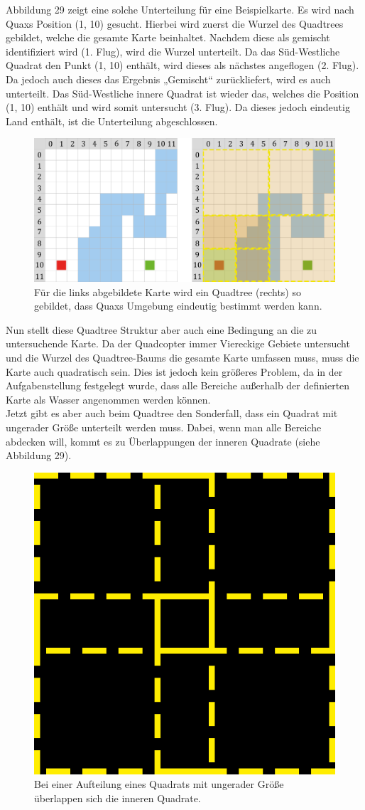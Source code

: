 \documentclass[a4paper,12pt]{article}
\begin{document}
Abbildung 29 zeigt eine solche Unterteilung für eine Beispielkarte. Es wird nach Quaxs Position (1, 10) gesucht. Hierbei wird zuerst die Wurzel des Quadtrees gebildet, welche die gesamte Karte beinhaltet. Nachdem diese als gemischt identifiziert wird (1. Flug), wird die Wurzel unterteilt. Da das Süd-Westliche Quadrat den Punkt (1, 10) enthält, wird dieses als nächstes angeflogen (2. Flug). Da jedoch auch dieses das Ergebnis „Gemischt“ zurückliefert, wird es auch unterteilt. Das Süd-Westliche innere Quadrat ist wieder das, welches die Position (1, 10) enthält und wird somit untersucht (3. Flug). Da dieses jedoch eindeutig Land enthält, ist die Unterteilung abgeschlossen.
\begin{figure}[H]
\centering
    \includegraphics[width=1\linewidth]{Bilder/Aufgabe3/Quadtree_01.png}
    \caption{Für die links abgebildete Karte wird ein Quadtree (rechts) so gebildet, dass Quaxs Umgebung eindeutig bestimmt werden kann.}
\end{figure}

Nun stellt diese Quadtree Struktur aber auch eine Bedingung an die zu untersuchende Karte. Da der Quadcopter immer Viereckige Gebiete untersucht und die Wurzel des Quadtree-Baums die gesamte Karte umfassen muss, muss die Karte auch quadratisch sein. Dies ist jedoch kein größeres Problem, da in der Aufgabenstellung festgelegt wurde, dass alle Bereiche außerhalb der definierten Karte als Wasser angenommen werden können.
\\[0.4cm]
Jetzt gibt es aber auch beim Quadtree den Sonderfall, dass ein Quadrat mit ungerader Größe unterteilt werden muss. Dabei, wenn man alle Bereiche abdecken will, kommt es zu Überlappungen der inneren Quadrate (siehe Abbildung 29).
\begin{figure}[H]
\centering
    \includegraphics[width=.5\linewidth]{Bilder/Aufgabe3/Quadtree_Ueberlappung.png}
    \caption{Bei einer Aufteilung eines Quadrats mit ungerader Größe überlappen sich die inneren Quadrate.}
\end{figure}
\end{document}
